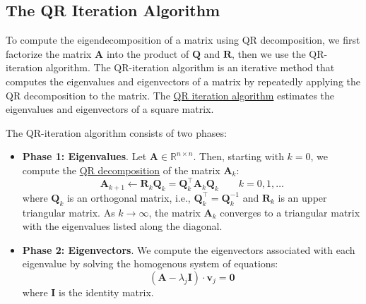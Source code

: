\documentclass{article}[11pt]
\begin{document}
\subsection{The QR Iteration Algorithm}
To compute the eigendecomposition of a matrix using QR decomposition, we first factorize the matrix $\mathbf{A}$ into the product of $\mathbf{Q}$ and $\mathbf{R}$, 
then we use the QR-iteration algorithm. The QR-iteration algorithm is an iterative method that computes the eigenvalues and eigenvectors of a matrix by repeatedly applying the QR decomposition to the matrix.
The \href{https://en.wikipedia.org/wiki/QR_algorithm}{QR iteration algorithm} estimates the eigenvalues and eigenvectors of a square matrix.
\begin{mdframed}
The QR-iteration algorithm consists of two phases:
\begin{itemize}[leftmargin=16pt]
\item{\textbf{Phase 1: Eigenvalues}. Let $\mathbf{A}\in\mathbb{R}^{n\times{n}}$. 
Then, starting with $k = 0$, we compute the \href{https://en.wikipedia.org/wiki/QR_decomposition}{QR decomposition} of the matrix $\mathbf{A}_{k}$:
\begin{equation*}
\mathbf{A}_{k+1}\leftarrow\mathbf{R}_{k}\mathbf{Q}_{k} = \mathbf{Q}_{k}^{\top}\mathbf{A}_{k}\mathbf{Q}_{k}\qquad{k=0,1,\dots} 
\end{equation*}
where $\mathbf{Q}_{k}$ is an orthogonal matrix, i.e., $\mathbf{Q}^{\top}_{k} = \mathbf{Q}^{-1}_{k}$ and $\mathbf{R}_{k}$ is an upper triangular matrix. 
As $k\rightarrow\infty$, the matrix $\mathbf{A}_{k}$ converges to a triangular matrix with the eigenvalues listed along the diagonal.}
\item{\textbf{Phase 2: Eigenvectors}. We compute the eigenvectors associated with each eigenvalue by solving the homogenous system of equations:
\begin{equation*}
\left(\mathbf{A}-\lambda_{j}\mathbf{I}\right)\cdot\mathbf{v}_{j} = \mathbf{0}
\end{equation*}
where $\mathbf{I}$ is the identity matrix.}
\end{itemize}
\end{mdframed}
\end{document}
